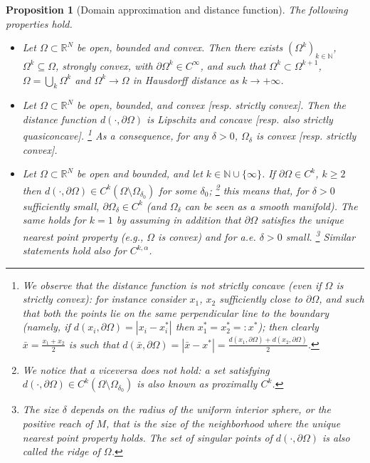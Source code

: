 \documentclass[11pt, reqno]{amsart}
\newtheorem{proposition}[lemma]{Proposition}
\theoremstyle{definition}
\numberwithin{equation}{section}
\newcommand{\R}{\mathbb{R}}
\newcommand{\N}{\mathbb{N}}
\begin{document}
\begin{proposition}[Domain approximation and distance function]
\label{prop_boundar_approximat}
The following properties hold.
\begin{itemize}
\item[(i)]
Let $\Omega \subset \R^N$ be open, bounded and convex. Then there exists $(\Omega^k)_{k\in \N}$, $\Omega^k \subseteq \Omega$, strongly convex, with $\partial \Omega^k \in C^{\infty}$, and such that $\Omega^{k} \subset \Omega^{k+1}$, $\Omega = \bigcup_k \Omega^k$ and $\Omega^k \to \Omega$ in Hausdorff distance as $k\to +\infty$.
\item[(ii)] Let $\Omega \subset \R^N$ be open, bounded, and convex [resp. strictly convex]. 
Then the distance function $d(\cdot, \partial\Omega)$ is Lipschitz and concave [resp. also strictly quasiconcave].%
\footnote{We observe that the distance function is not strictly concave (even if $\Omega$ is strictly convex): for instance consider $x_1$, $x_2$ sufficiently close to $\partial \Omega$, and such that both the points lie on the same perpendicular line to the boundary (namely, if $d(x_i, \partial \Omega)=|x_i- x_i^*|$ then $x_1^*=x_2^*=:x^*$); then clearly $\bar{x} = \frac{x_1+x_2}{2}$ is such that $d(\bar{x}, \partial \Omega) = |\bar{x}-x^*| = \frac{d(x_1, \partial \Omega) + d(x_2,\partial \Omega)}{2}$.
} 
As a consequence, for any $\delta>0$, $\Omega_{\delta}$ is convex [resp. strictly convex].

\item[(iii)] Let $\Omega \subset \R^N$ be open and bounded, and let $k \in \N \cup \{\infty\}$. 
If $\partial \Omega \in C^k$, $k \geq 2$ then $d(\cdot, \partial \Omega) \in C^k(\Omega \setminus \Omega_{\delta_0})$ for some $\delta_0$;%
\footnote{We notice that a viceversa does not hold: a set satisfying $d(\cdot, \partial \Omega) \in C^k(\Omega \setminus \Omega_{\delta_0})$ is also known as \emph{proximally $C^k$}.} 
this means that, for $\delta>0$ sufficiently small, $\partial \Omega_{\delta} \in C^k$ (and $\Omega_{\delta}$ can be seen as a smooth manifold).
The same holds for $k=1$ by assuming in addition that $\partial \Omega$ satisfies the unique nearest point property (e.g., $\Omega$ is convex) and for a.e. $\delta>0$ small.%
\footnote{The size $\delta$ depends on the radius of the uniform interior sphere, or the \emph{positive reach} of $M$, that is the size of the neighborhood where the unique nearest point property holds. The set of singular points of $d(\cdot, \partial\Omega)$ is also called the \emph{ridge} of $\Omega$.}
Similar statements hold also for $C^{k,\alpha}$.
\end{itemize}
\end{proposition}
\end{document}
